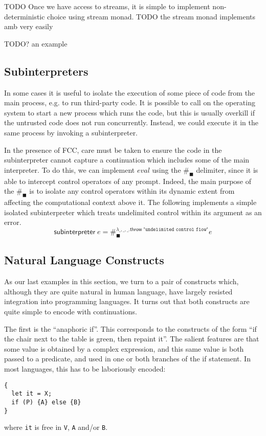 \documentclass[11pt]{article}
\newcommand{\maybePage}{\newpage}
\begin{document}
TODO Once we have access to streams, it is simple to implement non-deterministic choice using stream monad.
TODO the stream monad implements amb very easily

TODO? an example

\maybePage
\subsection{Subinterpreters}

In some cases it is useful to isolate the execution of some piece of code from the main process, e.g. to run third-party code.
It is possible to call on the operating system to start a new process which runs the code, but this is usually overkill if the untrusted code does not run concurrently.
Instead, we could execute it in the same process by invoking a subinterpreter.

In the presence of FCC, care must be taken to ensure the code in the subinterpreter cannot capture a continuation which includes some of the main interpreter.
To do this, we can implement $eval$ using the $\#_\blacksquare$ delimiter, since it is able to intercept control operators of any prompt.
Indeed, the main purpose of the $\#_\blacksquare$ is to isolate any control operators within its dynamic extent from affecting the computational context above it.
The following implements a simple isolated subinterpreter which treats undelimited control within its argument as an error.
$$\textsf{subinterpreter}\;e = \#_\blacksquare^{\lambda\_,\_,\_.\textsf{throw}\;\texttt{"undelimited control flow"}}e$$



\maybePage
\subsection{Natural Language Constructs}

As our last examples in this section, we turn to a pair of constructs which, although they are quite natural in human language, have largely resisted integration into programming languages.
It turns out that both constructs are quite simple to encode with continuations.

The first is the ``anaphoric if''.
This corresponds to the constructs of the form ``if the chair next to the table is green, then repaint it''.
The salient features are that some value is obtained by a complex expression, and this same value is both passed to a predicate, and used in one or both branches of the if statement.
In most languages, this has to be laboriously encoded:
\begin{verbatim}
{
  let it = X;
  if (P) {A} else {B}
}
\end{verbatim}
where \texttt{it} is free in \texttt{V}, \texttt{A} and/or \texttt{B}.
\end{document}
